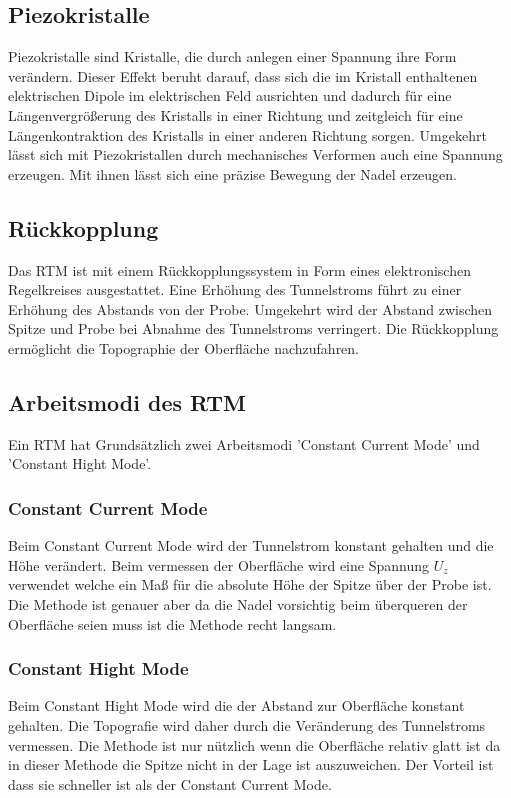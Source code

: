\subsection{Piezokristalle}
Piezokristalle sind Kristalle, die durch anlegen einer Spannung ihre Form verändern. Dieser Effekt beruht darauf, dass sich die im Kristall enthaltenen elektrischen Dipole im elektrischen Feld ausrichten und dadurch für eine Längenvergrößerung des Kristalls in einer Richtung und zeitgleich für eine Längenkontraktion des Kristalls in einer anderen Richtung sorgen. Umgekehrt lässt sich mit
Piezokristallen durch mechanisches Verformen auch eine Spannung erzeugen.
Mit ihnen lässt sich eine präzise Bewegung der Nadel erzeugen. 
\subsection{Rückkopplung}
Das RTM ist mit einem Rückkopplungssystem in Form eines elektronischen Regelkreises
ausgestattet. Eine Erhöhung des Tunnelstroms führt zu einer Erhöhung des Abstands von der Probe. Umgekehrt wird der Abstand zwischen Spitze und Probe bei Abnahme des Tunnelstroms verringert. Die Rückkopplung ermöglicht die Topographie der Oberfläche nachzufahren.
\subsection{Arbeitsmodi des RTM}
Ein RTM hat Grundsätzlich zwei Arbeitsmodi 'Constant Current Mode' und 'Constant Hight Mode'.
\subsubsection{Constant Current Mode}
Beim Constant Current Mode wird der Tunnelstrom konstant gehalten und die Höhe verändert. Beim vermessen der Oberfläche wird eine Spannung $U_z$ verwendet welche ein Maß für die absolute Höhe der Spitze über der Probe ist. Die Methode ist genauer aber da die Nadel vorsichtig beim überqueren der Oberfläche seien muss ist die Methode recht langsam. 
\subsubsection{Constant Hight Mode}
Beim Constant Hight Mode wird die der Abstand zur Oberfläche konstant gehalten. Die Topografie wird daher durch die Veränderung des Tunnelstroms vermessen. Die Methode ist nur nützlich wenn die Oberfläche relativ glatt ist da in dieser Methode die Spitze nicht in der Lage ist auszuweichen. Der Vorteil ist dass sie schneller ist als der Constant Current Mode.
